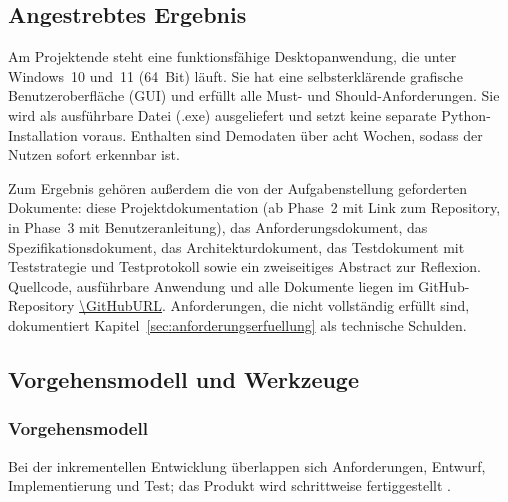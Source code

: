 \subsection{Angestrebtes Ergebnis}
Am Projektende steht eine funktionsfähige Desktopanwendung, die unter Windows~10 und~11 (64~Bit) läuft. Sie hat eine selbsterklärende grafische Benutzeroberfläche (\ac{GUI}) und erfüllt alle Must- und Should-Anforderungen. Sie wird als ausführbare Datei (.exe) ausgeliefert und setzt keine separate Python-Installation voraus. Enthalten sind Demodaten über acht Wochen, sodass der Nutzen sofort erkennbar ist.

Zum Ergebnis gehören außerdem die von der Aufgabenstellung geforderten Dokumente: diese Projektdokumentation (ab Phase~2 mit Link zum Repository, in Phase~3 mit Benutzeranleitung), das Anforderungsdokument, das Spezifikationsdokument, das Architekturdokument, das Testdokument mit Teststrategie und Testprotokoll sowie ein zweiseitiges Abstract zur Reflexion. Quellcode, ausführbare Anwendung und alle Dokumente liegen im GitHub-Repository \url{\GitHubURL}. Anforderungen, die nicht vollständig erfüllt sind, dokumentiert Kapitel~\ref{sec:anforderungserfuellung} als technische Schulden.

\subsection{Vorgehensmodell und Werkzeuge}\label{sec:vorgehen}
\subsubsection{Vorgehensmodell}
Bei der inkrementellen Entwicklung überlappen sich Anforderungen, Entwurf, Implementierung und Test; das Produkt wird schrittweise fertiggestellt \parencite[S.~10-5]{swebok2026}.

